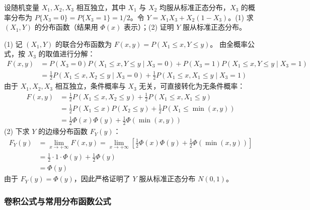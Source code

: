 ﻿\documentclass[lang=cn,11pt]{elegantbook}
\begin{document}
\begin{exercise} \label{exer:3-8d}
设随机变量 $X_1, X_2, X_3$ 相互独立，其中 $X_1$ 与 $X_2$ 均服从标准正态分布，$X_3$ 的概率分布为 $P\{X_3 = 0\} = P\{X_3 = 1\} = 1/2$。令  $Y = X_1 X_3 + X_2 (1-X_3)$。(1) 求 $(X_1, Y)$ 的分布函数（结果用 $\Phi(x)$ 表示）；(2) 证明 $Y$ 服从标准正态分布。
\end{exercise}
\begin{solution}
(1) 记 $(X_1, Y)$ 的联合分布函数为 $F(x,y) = P(X_1 \leqslant x, Y \leqslant y)$。
由全概率公式，按 $X_3$ 的取值进行分解：
\begin{align*}
    F(x,y) &= P(X_3 = 0) P(X_1 \leqslant x, Y \leqslant y \mid X_3 = 0) + P(X_3 = 1) P(X_1 \leqslant x, Y \leqslant y \mid X_3 = 1) \\
    &= \frac{1}{2} P(X_1 \leqslant x, X_2 \leqslant y \mid X_3 = 0) + \frac{1}{2} P(X_1 \leqslant x, X_1 \leqslant y \mid X_3 = 1)
\end{align*}
由于 $X_1, X_2, X_3$ 相互独立，条件概率与 $X_3$ 无关，可直接转化为无条件概率：
\begin{align*}
    F(x,y) &= \frac{1}{2} P(X_1 \leqslant x, X_2 \leqslant y) + \frac{1}{2} P(X_1 \leqslant x, X_1 \leqslant y) \\
    &= \frac{1}{2} P(X_1 \leqslant x)P(X_2 \leqslant y) + \frac{1}{2} P(X_1 \leqslant \min(x,y)) \\
    &= \frac{1}{2} \Phi(x)\Phi(y) + \frac{1}{2} \Phi(\min(x,y))
\end{align*}
(2) 下求 $Y$ 的边缘分布函数 $F_Y(y)$：
\begin{align*}
    F_Y(y) &= \lim_{x \to +\infty} F(x,y) = \lim_{x \to +\infty} \left[ \frac{1}{2} \Phi(x)\Phi(y) + \frac{1}{2} \Phi(\min(x,y)) \right] \\
    &= \frac{1}{2} \cdot 1 \cdot \Phi(y) + \frac{1}{2} \Phi(y) \\
    &= \Phi(y)
\end{align*}
由于 $F_Y(y) = \Phi(y)$，因此严格证明了 $Y$ 服从标准正态分布 $N(0,1)$。
\end{solution}

\subsubsection{卷积公式与常用分布函数公式}
\end{document}
